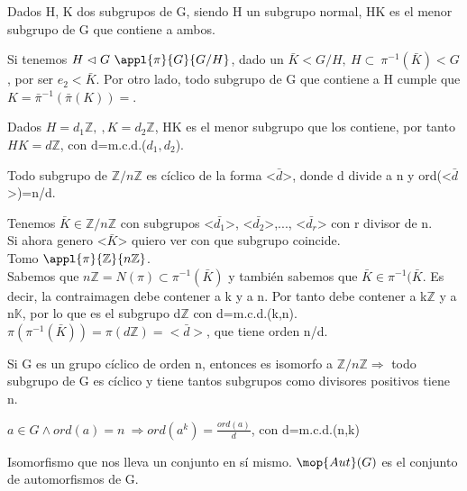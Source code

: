 \documentclass[nochap]{apuntes}
\begin{document}
\begin{defn}
Dados H, K dos subgrupos de G, siendo H un subgrupo normal, HK es el menor subgrupo de G que contiene a ambos.
\end{defn}

 Si tenemos $H \vartriangleleft G \ \appl{\pi}{G}{G/H}$, dado un $\bar{K} < G/H, \  H \subset \ \pi^{-1}(\bar{K}) < G $, por ser $e_2 < \bar{K}$. Por otro lado, todo subgrupo de G que contiene a H cumple que $K=\bar{\pi}^{-1}(\bar{\pi}(K))=$.

 \begin{example}
  Dados $H=d_1\mathbb{Z}, \ , K=d_2\mathbb{Z}$, HK es el menor subgrupo que los contiene, por tanto $HK=d\mathbb{Z}$, con d=m.c.d.($d_1, d_2$).
 \end{example}

 \begin{theorem}
  Todo subgrupo de $\mathbb{Z}/n\mathbb{Z}$  es cíclico de la forma <$\bar{d}$>, donde d divide a n y ord(<$\bar{d}$>)=n/d.
 \end{theorem}
\begin{example}
 Tenemos $\bar{K}\in \mathbb{Z}/n\mathbb{Z}$  con subgrupos <$\bar{d_1}$>, <$\bar{d_2}$>,..., <$\bar{d_r}$> con r divisor de n.\\
 Si ahora genero <$\bar{K}$> quiero ver con que subgrupo coincide.\\
 Tomo $\appl{\pi}{\mathbb{Z}}{n\mathbb{Z}}$.\\
 Sabemos que $n\mathbb{Z}=N(\pi) \subset \pi^{-1}(\bar{K})$  y también sabemos que $\bar{K} \in \pi^{-1}(\bar{K}$. Es decir,
 la contraimagen debe contener a k y a n. Por tanto debe contener a k$\mathbb{Z}$  y a n$\mathbb{K}$, por lo que es el subgrupo
 d$\mathbb{Z}$  con d=m.c.d.(k,n).\\
 $\pi(\pi^{-1}(\bar{K}))=\pi(d\mathbb{Z})=<\bar{d}>$, que tiene orden n/d.
\end{example}

Si G es un grupo cíclico de orden n, entonces es isomorfo a $\mathbb{Z}/n\mathbb{Z} \Rightarrow$  todo subgrupo de G es cíclico y
tiene tantos subgrupos como divisores positivos tiene n.

\begin{theorem}
 $a\in G \wedge ord(a)=n \ \Rightarrow ord(a^{k})=\frac{ord(a)}{d}$, con d=m.c.d.(n,k)
\end{theorem}

\begin{defn}[Automorfismo]\label{defAutomorfismo}
 Isomorfismo que nos lleva un conjunto en sí mismo. $\mop{Aut}(G)$ es el conjunto de automorfismos de G.
\end{defn}
\end{document}
